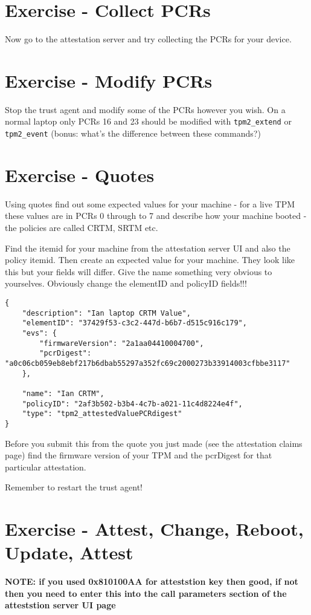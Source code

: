 \documentclass[10pt,a4paper]{article}
\begin{document}
\section{Exercise - Collect PCRs}
Now go to the attestation server and try collecting the PCRs for your device.


\section{Exercise - Modify PCRs}
Stop the trust agent and modify some of the PCRs however you wish. On a normal laptop only PCRs 16 and 23 should be modified with \texttt{tpm2\_extend} or \texttt{tpm2\_event}  (bonus: what's the difference between these commands?)

\section{Exercise - Quotes}
Using quotes find out some expected values for your machine - for a live TPM these values are in PCRs 0 through to 7 and describe how your machine booted - the policies are called CRTM, SRTM etc. 

Find the itemid for your machine from the attestation server UI and also the policy itemid. Then create an expected value for your machine. They look like this but your fields will differ. Give the name something very obvious to yourselves. Obviously change the elementID and policyID fields!!!

\begin{verbatim}
{
    "description": "Ian laptop CRTM Value",
    "elementID": "37429f53-c3c2-447d-b6b7-d515c916c179",
    "evs": {
        "firmwareVersion": "2a1aa04410004700",
        "pcrDigest": "a0c06cb059eb8ebf217b6dbab55297a352fc69c2000273b33914003cfbbe3117"
    },

    "name": "Ian CRTM",
    "policyID": "2af3b502-b3b4-4c7b-a021-11c4d8224e4f",
    "type": "tpm2_attestedValuePCRdigest"
}
\end{verbatim}


Before you submit this from the quote you just made (see the attestation claims page) find the firmware version of your TPM and the pcrDigest for that particular attestation.

Remember to restart the trust agent!

\section{Exercise - Attest, Change, Reboot, Update, Attest}
\textbf{NOTE: if you used 0x810100AA for atteststion key then good, if not then you need to enter this into the call parameters section of the atteststion server UI page}
\end{document}
